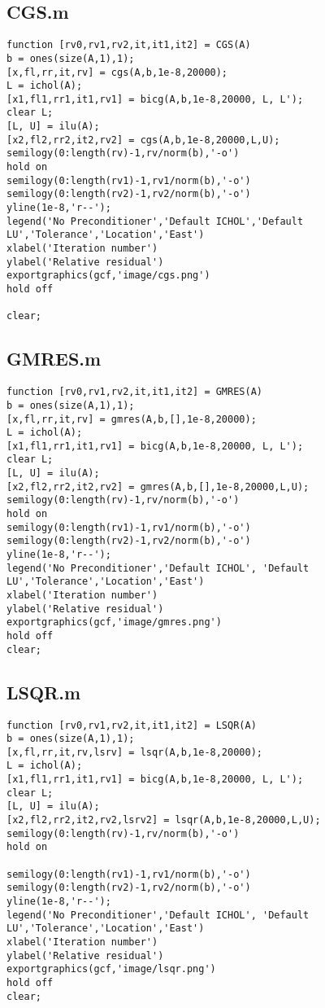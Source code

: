 \subsection*{CGS.m}
\begin{lstlisting}
function [rv0,rv1,rv2,it,it1,it2] = CGS(A)
b = ones(size(A,1),1);
[x,fl,rr,it,rv] = cgs(A,b,1e-8,20000);
L = ichol(A);
[x1,fl1,rr1,it1,rv1] = bicg(A,b,1e-8,20000, L, L');
clear L;
[L, U] = ilu(A);
[x2,fl2,rr2,it2,rv2] = cgs(A,b,1e-8,20000,L,U);
semilogy(0:length(rv)-1,rv/norm(b),'-o')
hold on
semilogy(0:length(rv1)-1,rv1/norm(b),'-o')
semilogy(0:length(rv2)-1,rv2/norm(b),'-o')
yline(1e-8,'r--');
legend('No Preconditioner','Default ICHOL','Default LU','Tolerance','Location','East')
xlabel('Iteration number')
ylabel('Relative residual')
exportgraphics(gcf,'image/cgs.png')
hold off

clear;
\end{lstlisting}

\subsection*{GMRES.m}
\begin{lstlisting}
function [rv0,rv1,rv2,it,it1,it2] = GMRES(A)
b = ones(size(A,1),1);
[x,fl,rr,it,rv] = gmres(A,b,[],1e-8,20000);
L = ichol(A);
[x1,fl1,rr1,it1,rv1] = bicg(A,b,1e-8,20000, L, L');
clear L;
[L, U] = ilu(A);
[x2,fl2,rr2,it2,rv2] = gmres(A,b,[],1e-8,20000,L,U);
semilogy(0:length(rv)-1,rv/norm(b),'-o')
hold on
semilogy(0:length(rv1)-1,rv1/norm(b),'-o')
semilogy(0:length(rv2)-1,rv2/norm(b),'-o')
yline(1e-8,'r--');
legend('No Preconditioner','Default ICHOL', 'Default LU','Tolerance','Location','East')
xlabel('Iteration number')
ylabel('Relative residual')
exportgraphics(gcf,'image/gmres.png')
hold off
clear;
\end{lstlisting}

\subsection*{LSQR.m}
\begin{lstlisting}
function [rv0,rv1,rv2,it,it1,it2] = LSQR(A)
b = ones(size(A,1),1);
[x,fl,rr,it,rv,lsrv] = lsqr(A,b,1e-8,20000);
L = ichol(A);
[x1,fl1,rr1,it1,rv1] = bicg(A,b,1e-8,20000, L, L');
clear L;
[L, U] = ilu(A);
[x2,fl2,rr2,it2,rv2,lsrv2] = lsqr(A,b,1e-8,20000,L,U);
semilogy(0:length(rv)-1,rv/norm(b),'-o')
hold on

semilogy(0:length(rv1)-1,rv1/norm(b),'-o')
semilogy(0:length(rv2)-1,rv2/norm(b),'-o')
yline(1e-8,'r--');
legend('No Preconditioner','Default ICHOL', 'Default LU','Tolerance','Location','East')
xlabel('Iteration number')
ylabel('Relative residual')
exportgraphics(gcf,'image/lsqr.png')
hold off
clear;
\end{lstlisting}


